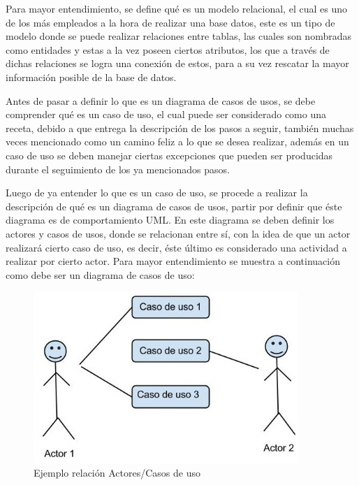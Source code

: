 \documentclass{memoria}
\begin{document}
Para mayor entendimiento, se define qué es un modelo relacional, el cual es uno de los más empleados a la hora de realizar una base datos, este es un tipo de modelo donde se puede realizar relaciones entre tablas, las cuales son nombradas como entidades y estas a la vez poseen ciertos atributos, los que a través de dichas relaciones se logra una conexión de estos, para a su vez rescatar la mayor información posible de la base de datos.\\


Antes de pasar a definir lo que es un diagrama de casos de usos, se debe comprender qué es un caso de uso, el cual puede ser considerado como una receta, debido a que entrega la descripción de los pasos a seguir, también muchas veces mencionado como un camino feliz a lo que se desea realizar, además en un caso de uso se deben manejar ciertas excepciones que pueden ser producidas durante el seguimiento de los ya mencionados pasos.

Luego de ya entender lo que es un caso de uso, se procede a realizar la descripción de qué es un diagrama de casos de usos, partir por definir que éste diagrama es de comportamiento UML. En este diagrama se deben definir los actores y casos de usos, donde se relacionan entre sí, con la idea de que un actor realizará cierto caso de uso, es decir, éste último es considerado una actividad a realizar por cierto actor. Para mayor entendimiento se muestra a continuación como debe ser un diagrama de casos de uso:\\

\begin{figure}[hbtp]
 \centering
 \includegraphics[width=10cm]{MarcoTeorico.jpg}
 \caption{Ejemplo relación Actores/Casos de uso}
 \end{figure}
 
\end{document}
